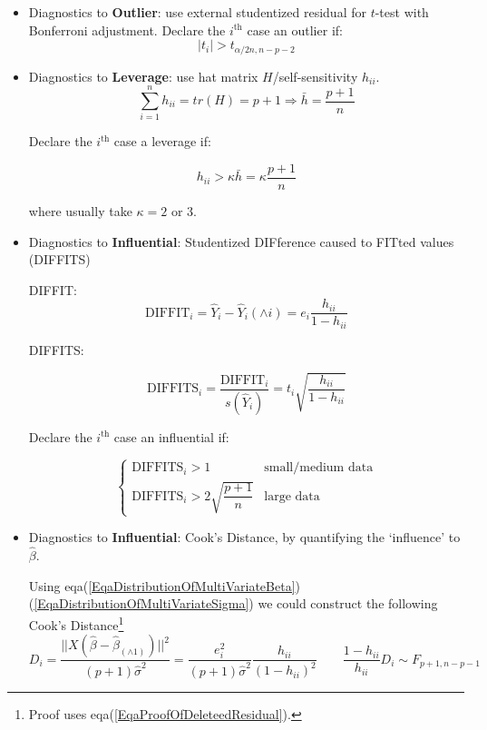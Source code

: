 \begin{itemize}[topsep=2pt,itemsep=0pt]
    \item Diagnostics to \textbf{Outlier}: use external studentized residual for $ t $-test with Bonferroni adjustment. Declare the $ i^\mathrm{th} $ case an outlier if: 
    \[
         |t_i|>t_{\alpha/2n,n-p-2}
    \]
    \item Diagnostics to \textbf{Leverage}: use hat matrix $ H $/self-sensitivity $ h_{ii} $.
    \[
        \sum_{i=1}^n h_{ii}=tr(H)=p+1 \Rightarrow \bar{h}=\dfrac{p+1}{n} 
    \]
    
    Declare the $ i^\mathrm{th}  $ case a {leverage} if:
    
    \[
        h_{ii}>\kappa \bar{h}=\kappa \dfrac{p+1}{n} 
    \]
    
    where usually take $ \kappa =2 $ or $ 3 $.
    \item Diagnostics to \textbf{Influential}: Studentized DIFference caused to FITted values (DIFFITS)
    
    DIFFIT:
    \[
        \mathrm{DIFFIT}_i=\hat{Y}_i-\hat{Y}_i(\wedge i)=e_i\dfrac{h_{ii}}{1-h_{ii}} 
    \]

    DIFFITS:
    
    \[
        \mathrm{DIFFITS}_i=\dfrac{\mathrm{DIFFIT}_i}{s(\hat{Y}_i)}=t_i\sqrt{\dfrac{h_{ii}}{1-h_{ii}}}
    \]
    
    Declare the $ i^\mathrm{th}  $ case an {influential} if:
    
    \[
        \begin{cases}
            \mathrm{DIFFITS}_i>1&\text{small/medium data} \\
            \mathrm{DIFFITS}_i>2\sqrt{\dfrac{p+1}{n}}&\text{large data}
        \end{cases}   
    \]
    
    \item Diagnostics to \textbf{Influential}: Cook's Distance, by quantifying the `influence' to $ \hat{\beta } $.
    
    Using eqa(\ref{EqaDistributionOfMultiVariateBeta})(\ref{EqaDistributionOfMultiVariateSigma}) we could construct the following Cook's Distance\footnote{Proof uses eqa(\ref{EqaProofOfDeleteedResidual}).}
    \[
         D_i=\dfrac{||X(\hat{\beta} -\hat{\beta }_{(\wedge 1)})||^2}{(p+1)\hat{\sigma }^2}=\dfrac{e_i^2}{(p+1)\hat{\sigma }^2}\dfrac{h_{ii}}{(1-h_{ii})^2}\qquad \dfrac{1-h_{ii}}{h_{ii}}D_i\sim F_{p+1,n-p-1}
    \]
    

\end{itemize}
